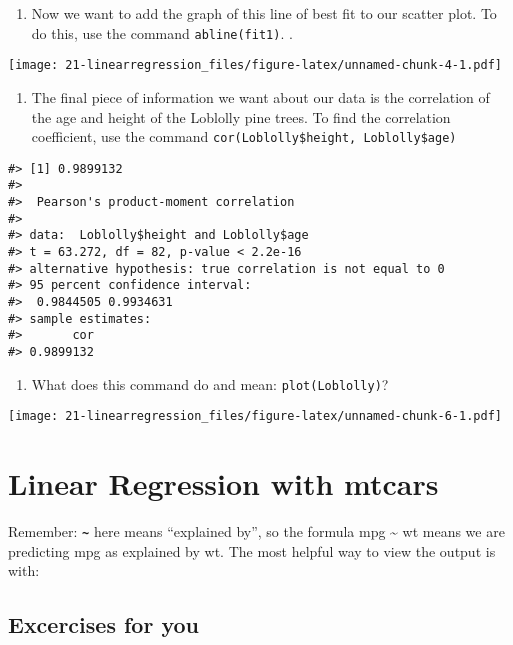\documentclass[
]{book}
\providecommand{\tightlist}{%
  \setlength{\itemsep}{0pt}\setlength{\parskip}{0pt}}
\begin{document}
\begin{enumerate}
\def\labelenumi{\arabic{enumi}.}
\setcounter{enumi}{4}
\tightlist
\item
  Now we want to add the graph of this line of best fit to our scatter plot. To do this, use the
  command \texttt{abline(fit1)}. .
\end{enumerate}

\texttt{[image: 21-linearregression\_files/figure-latex/unnamed-chunk-4-1.pdf]}

\begin{enumerate}
\def\labelenumi{\arabic{enumi}.}
\setcounter{enumi}{8}
\tightlist
\item
  The final piece of information we want about our data is the correlation of the age and height
  of the Loblolly pine trees. To find the correlation coefficient, use the command \texttt{cor(Loblolly\$height,\ Loblolly\$age)}
\end{enumerate}

\begin{verbatim}
#> [1] 0.9899132
#> 
#>  Pearson's product-moment correlation
#> 
#> data:  Loblolly$height and Loblolly$age
#> t = 63.272, df = 82, p-value < 2.2e-16
#> alternative hypothesis: true correlation is not equal to 0
#> 95 percent confidence interval:
#>  0.9844505 0.9934631
#> sample estimates:
#>       cor 
#> 0.9899132
\end{verbatim}

\begin{enumerate}
\def\labelenumi{\arabic{enumi}.}
\setcounter{enumi}{9}
\tightlist
\item
  What does this command do and mean: \texttt{plot(Loblolly)}?
\end{enumerate}

\texttt{[image: 21-linearregression\_files/figure-latex/unnamed-chunk-6-1.pdf]}

\hypertarget{linear-regression-with-mtcars}{%
\chapter{Linear Regression with mtcars}\label{linear-regression-with-mtcars}}

Remember: \textbf{\texttt{\textasciitilde{}}} here means ``explained by'', so the formula mpg \textasciitilde{} wt means we are predicting mpg as explained by wt. The most helpful way to view the output is with:

\hypertarget{excercises-for-you}{%
\section{\texorpdfstring{Excercises for \textbf{you}}{Excercises for you}}\label{excercises-for-you}}
\end{document}
